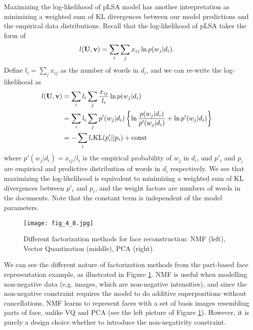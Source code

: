 \documentclass[../book-template.tex]{subfiles}
\begin{document}
\begin{remark}
	Maximizing the log-likelihood of pLSA model has another interpretation as minimizing a weighted sum of KL divergences between our model predictions and the empirical data distributions. Recall that the log-likelihood of pLSA takes the form of
	\begin{equation*}
		l({\bf U,v})=\sum_{i}\sum_{j}x_{ij} \ln p(w_j|d_i).
	\end{equation*}
	Define $l_i=\sum_j x_{ij}$ as the number of words in $d_i$, and we can re-write the log-likelihood as
	\begin{align*}
		l({\bf U,v})&=\sum_{i}l_i\sum_{j}\frac{x_{ij}}{l_i}\ln p(w_j|d_i)\\
		&= \sum_{i}l_i\sum_{j} p'(w_j|d_i)\left\{\ln \frac{p(w_j|d_i)}{p'(w_j|d_i)} +\ln p'(w_j|d_i)\right\}\\
		&= -\sum_{i}l_i {\rm KL}(p'_{i}||p_i) + {\rm const}
	\end{align*}
	where $p'(w_j|d_i) = x_{ij}/l_i$ is the empirical probability of $w_j$ in $d_i$, and $p'_i$ and $p_i$ are empirical and predictive distribution of words in $d_i$ respectively. We see that maximizing the log-likelihood is equivalent to minimizing a weighted sum of KL divergences between $p'_i$ and $p_i$, and the weight factors are numbers of words in the documents. Note that the constant term is independent of the model parameters.
\end{remark}
\begin{figure}[h] 
	\centering 
	\texttt{[image: fig\_4\_8.jpg]} 
	\caption{Different factorization methods for face reconstruction: NMF (left), Vector Quantization (middle), PCA (right).}\label{fig_4_8}
\end{figure}
\par We can see the different nature of factorization methods from the part-based face representation example, as illustrated in Figure \ref{fig_4_8}. NMF is useful when modelling non-negative data (e.g. images, which are non-negative intensities), and since the non-negative constraint requires the model to do additive superpositions without cancellations, NMF learns to represent faces with a set of basis images resembling parts of face, unlike VQ and PCA (see the left picture of Figure \ref{fig_4_8}). However, it is purely a design choice whether to introduce the non-negativity constraint.
\end{document}
